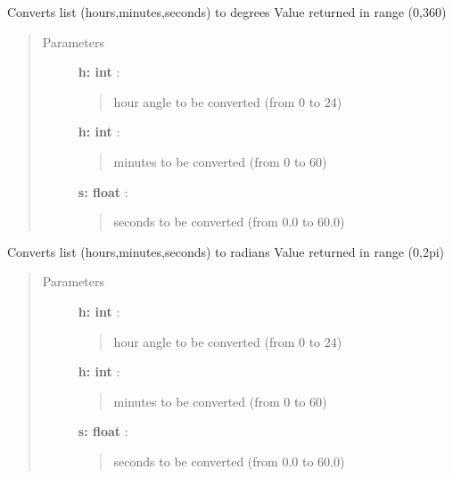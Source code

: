 \documentclass[letterpaper,10pt,english]{sphinxmanual}
\begin{document}

\begin{fulllineitems}
\label{index:astroCoords.rahms2deg}
Converts list (hours,minutes,seconds) to degrees
Value returned in range (0,360)
\begin{quote}\begin{description}
\item[{Parameters }] \leavevmode
\textbf{h: int} :
\begin{quote}

hour angle to be converted (from 0 to 24)
\end{quote}

\textbf{h: int} :
\begin{quote}

minutes to be converted (from 0 to 60)
\end{quote}

\textbf{s: float} :
\begin{quote}

seconds to be converted (from 0.0 to 60.0)
\end{quote}

\end{description}\end{quote}

\end{fulllineitems}



\begin{fulllineitems}
\label{index:astroCoords.rahms2rad}
Converts list (hours,minutes,seconds) to radians
Value returned in range (0,2pi)
\begin{quote}\begin{description}
\item[{Parameters }] \leavevmode
\textbf{h: int} :
\begin{quote}

hour angle to be converted (from 0 to 24)
\end{quote}

\textbf{h: int} :
\begin{quote}

minutes to be converted (from 0 to 60)
\end{quote}

\textbf{s: float} :
\begin{quote}

seconds to be converted (from 0.0 to 60.0)
\end{quote}

\end{description}\end{quote}

\end{fulllineitems}
\end{document}
